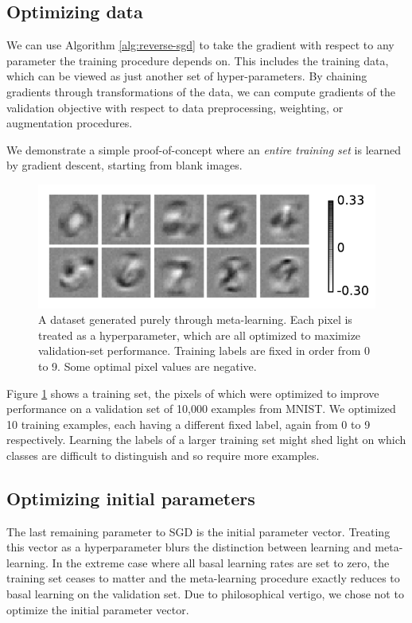 \documentclass{article}
\newcommand{\primal}{basal}
\begin{document}
\subsection{Optimizing data}

We can use Algorithm \ref{alg:reverse-sgd} to take the gradient with respect to any parameter the training procedure depends on.
This includes the training data, which can be viewed as just another set of hyper-parameters.
By chaining gradients through transformations of the data, we can compute gradients of the validation objective with respect to data preprocessing, weighting, or augmentation procedures.

We demonstrate a simple proof-of-concept where an \emph{entire training set} is learned by gradient descent, starting from blank images.
%
\begin{figure}[h!]
\begin{center}
\includegraphics[width=\columnwidth]{../experiments/Jan_19_optimize_data/9_color_bar/fake_data.pdf}
\caption{A dataset generated purely through meta-learning.
Each pixel is treated as a hyperparameter, which are all optimized to maximize validation-set performance.
Training labels are fixed in order from 0 to 9.
Some optimal pixel values are negative.}
\label{fig:fake data}
\end{center}
\end{figure} 
%
Figure \ref{fig:fake data} shows a training set, the pixels of which were optimized to improve performance on a validation set of 10,000 examples from MNIST.
We optimized 10 training examples, each having a different fixed label, again from 0 to 9 respectively.
Learning the labels of a larger training set might shed light on which classes are difficult to distinguish and so require more examples.

\subsection{Optimizing initial parameters}
The last remaining parameter to SGD is the initial parameter vector.
Treating this vector as a hyperparameter blurs the distinction between learning and meta-learning.
In the extreme case where all \primal{} learning rates are set to zero, the training set ceases to matter and the meta-learning procedure exactly reduces to \primal{} learning on the validation set.
Due to philosophical vertigo, we chose not to optimize the initial parameter vector.
\end{document}
